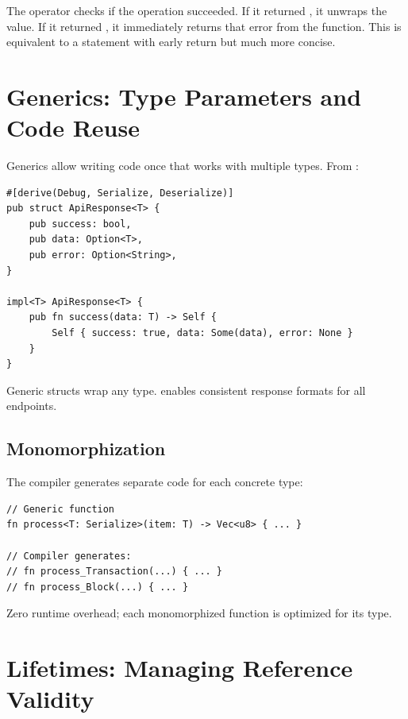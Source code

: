 The  operator checks if the operation succeeded. If it returned , it unwraps the value. If it returned , it immediately returns that error from the function. This is equivalent to a  statement with early return but much more concise.

\section{Generics: Type Parameters and Code Reuse}
\label{sec:ch24-generics}

Generics allow writing code once that works with multiple types. From :

\begin{listing}[htbp]
\caption{Generic struct for API responses}
\label{lst:ch24-generic-struct}
\begin{verbatim}
#[derive(Debug, Serialize, Deserialize)]
pub struct ApiResponse<T> {
    pub success: bool,
    pub data: Option<T>,
    pub error: Option<String>,
}

impl<T> ApiResponse<T> {
    pub fn success(data: T) -> Self {
        Self { success: true, data: Some(data), error: None }
    }
}
\end{verbatim}
\end{listing}

Generic structs wrap any type.  enables consistent response formats for all endpoints.

\subsection{Monomorphization}
\label{subsec:ch24-monomorphization}

The compiler generates separate code for each concrete type:

\begin{verbatim}
// Generic function
fn process<T: Serialize>(item: T) -> Vec<u8> { ... }

// Compiler generates:
// fn process_Transaction(...) { ... }
// fn process_Block(...) { ... }
\end{verbatim}

Zero runtime overhead; each monomorphized function is optimized for its type.

\section{Lifetimes: Managing Reference Validity}
\label{sec:ch24-lifetimes}

